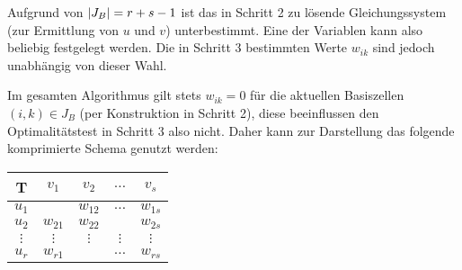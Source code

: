 \begin{bemerkung} %
	Aufgrund von $\left| J_B \right| = r + s - 1$ ist das in Schritt 2 zu lösende Gleichungssystem (zur Ermittlung von $u$ und $v$) unterbestimmt. Eine der Variablen kann also beliebig festgelegt werden. Die in Schritt 3 bestimmten Werte $w_{ik}$ sind jedoch unabhängig von dieser Wahl.
\end{bemerkung}

Im gesamten Algorithmus gilt stets $w_{ik} = 0$ für die aktuellen Basiszellen $(i,k) \in J_B$ (per Konstruktion in Schritt 2), diese beeinflussen den Optimalitätstest in Schritt 3 also nicht. Daher kann zur Darstellung das folgende komprimierte Schema genutzt werden:

\begin{center}
	\begin{tabular}{c|cccc}
		T & $v_1$ & $v_2$ & $\dots$ & $v_s$ \\ \hline
		$u_1$ & \fbox{$x_{11}$} & $w_{12}$  & $\dots$ & $w_{1s}$ \\
		$u_2$ & $w_{21}$ & $w_{22}$ & \fbox{$x_{23}$} & $w_{2s}$ \\
		$\vdots$ &  $\vdots$ & $\vdots$ & $\vdots$ & $\vdots$ \\
		$u_r$ & $w_{r1}$ & \fbox{$x_{r2}$} & $\dots$ & $w_{rs}$ 
	\end{tabular}
\end{center}


